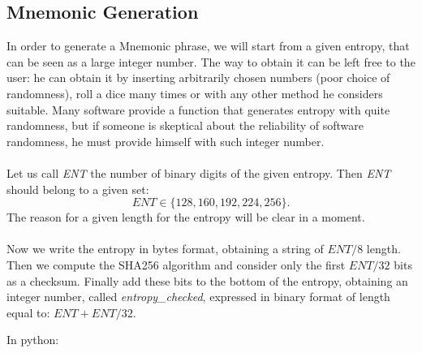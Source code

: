 \subsection{Mnemonic Generation}
In order to generate a Mnemonic phrase, we will start from a given entropy, that can be seen as a large integer number. The way to obtain it can be left free to the user: he can obtain it by inserting arbitrarily chosen numbers (poor choice of randomness), roll a dice many times or with any other method he considers suitable. Many software provide a function that generates entropy with quite randomness, but if someone is skeptical about the reliability of software randomness, he must provide himself with such integer number.
\\ \\
Let us call \textit{ENT} the number of binary digits of the given entropy. Then \textit{ENT} should belong to a given set:
\begin{equation*}
	ENT \in \{128,160,192,224,256\}.
\end{equation*}
The reason for a given length for the entropy will be clear in a moment.
\\ \\
Now we write the entropy in bytes format, obtaining a string of $ENT/8$ length. Then we compute the SHA256 algorithm and consider only the first $ENT/32$ bits as a checksum. Finally add these bits to the bottom of the entropy, obtaining an integer number, called \textit{entropy\_checked}, expressed in binary format of length equal to: $ENT+ENT/32$.

\begin{flushleft}
	In python:
\end{flushleft}

